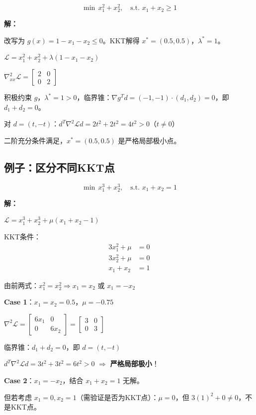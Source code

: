 \begin{example}[二阶条件验证]
\[
\min \, x_1^2 + x_2^2, \quad \text{s.t. } x_1 + x_2 \geq 1
\]

\textbf{解：}

改写为 $g(x) = 1 - x_1 - x_2 \leq 0$。KKT解得 $x^* = (0.5, 0.5)$，$\lambda^* = 1$。

$\mathcal{L} = x_1^2 + x_2^2 + \lambda(1 - x_1 - x_2)$

$\nabla^2_{xx} \mathcal{L} = \begin{bmatrix} 2 & 0 \\ 0 & 2 \end{bmatrix}$

积极约束 $g$，$\lambda^* = 1 > 0$，临界锥：$\nabla g^T d = (-1,-1) \cdot (d_1, d_2) = 0$，即 $d_1 + d_2 = 0$。

对 $d = (t, -t)$：$d^T \nabla^2 \mathcal{L} d = 2t^2 + 2t^2 = 4t^2 > 0$（$t \neq 0$）

二阶充分条件满足，$x^* = (0.5, 0.5)$ 是严格局部极小点。
\end{example}

\subsection{例子：区分不同KKT点}

\begin{example}[多个KKT点的判断]
\[
\min \, x_1^3 + x_2^3, \quad \text{s.t. } x_1 + x_2 = 1
\]

\textbf{解：}

$\mathcal{L} = x_1^3 + x_2^3 + \mu(x_1 + x_2 - 1)$

KKT条件：
\begin{align*}
3x_1^2 + \mu &= 0 \\
3x_2^2 + \mu &= 0 \\
x_1 + x_2 &= 1
\end{align*}

由前两式：$x_1^2 = x_2^2 \Rightarrow x_1 = x_2$ 或 $x_1 = -x_2$

\textbf{Case 1}：$x_1 = x_2 = 0.5$，$\mu = -0.75$

$\nabla^2 \mathcal{L} = \begin{bmatrix} 6x_1 & 0 \\ 0 & 6x_2 \end{bmatrix} = \begin{bmatrix} 3 & 0 \\ 0 & 3 \end{bmatrix}$

临界锥：$d_1 + d_2 = 0$，即 $d = (t, -t)$

$d^T \nabla^2 \mathcal{L} d = 3t^2 + 3t^2 = 6t^2 > 0$ $\Rightarrow$ \textbf{严格局部极小}！

\textbf{Case 2}：$x_1 = -x_2$，结合 $x_1 + x_2 = 1$ 无解。

但若考虑 $x_1 = 0, x_2 = 1$（需验证是否为KKT点）：$\mu = 0$，但 $3(1)^2 + 0 \neq 0$，不是KKT点。
\end{example}

